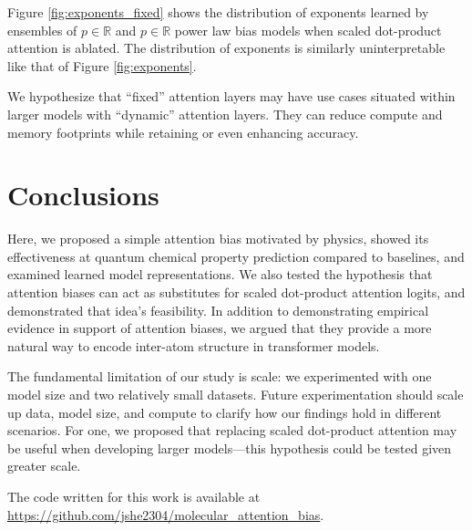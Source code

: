 \documentclass{article}
\begin{document}
Figure \ref{fig:exponents_fixed} shows the distribution of exponents learned by ensembles of $p \in \mathbb{R}$ and $p \in \mathbb{R}$ power law bias models when scaled dot-product attention is ablated. The distribution of exponents is similarly uninterpretable like that of Figure \ref{fig:exponents}. 

We hypothesize that ``fixed'' attention layers may have use cases situated within larger models with ``dynamic'' attention layers. They can reduce compute and memory footprints while retaining or even enhancing accuracy. 

\section{Conclusions}

Here, we proposed a simple attention bias motivated by physics, showed its effectiveness at quantum chemical property prediction compared to baselines, and examined learned model representations. We also tested the hypothesis that attention biases can act as substitutes for scaled dot-product attention logits, and demonstrated that idea's feasibility. In addition to demonstrating empirical evidence in support of attention biases, we argued that they provide a more natural way to encode inter-atom structure in transformer models. 

The fundamental limitation of our study is scale: we experimented with one model size and two relatively small datasets. Future experimentation should scale up data, model size, and compute to clarify how our findings hold in different scenarios. For one, we proposed that replacing scaled dot-product attention may be useful when developing larger models—this hypothesis could be tested given greater scale. 

The code written for this work is available at \url{https://github.com/jshe2304/molecular_attention_bias}. 


\end{document}
